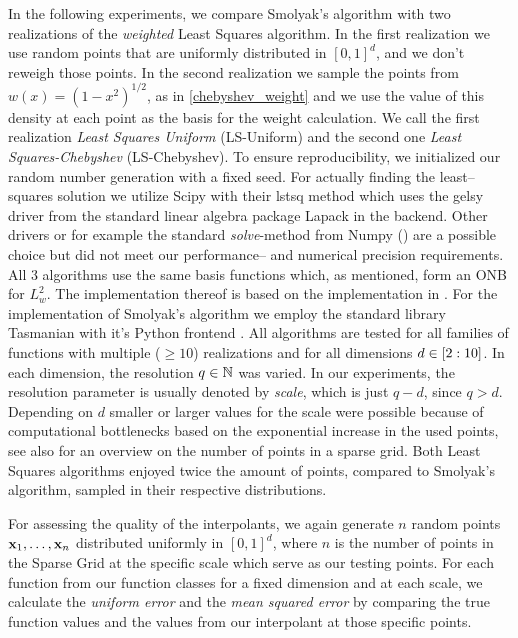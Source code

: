 \documentclass[12pt, oneside]{amsart}
\theoremstyle{definition}
\theoremstyle{remark}
\numberwithin{equation}{section}
\begin{document}
In the following experiments, we compare Smolyak's algorithm with two 
realizations of the \emph{weighted} Least Squares algorithm. In the first 
realization we use random points that are uniformly distributed in $[0,1]^d$, 
and we don't reweigh those points. In the second realization we sample the 
points from $w(x) = (1-x^2)^{1/2}$, as in \ref{chebyshev_weight} and we use the 
value of 
this density at each point as the basis for the weight calculation.
We call the first realization \emph{Least Squares Uniform} (LS-Uniform) and the 
second one \emph{Least Squares-Chebyshev} (LS-Chebyshev). 
To ensure reproducibility, we initialized our random number generation with a 
fixed seed.
For actually finding the least--squares solution we utilize Scipy 
\cite{Virtanen_Scipy} with their \textrm{lstsq} method which uses the 
\textrm{gelsy} driver from the standard linear algebra package Lapack 
\cite{lapack99} in the backend.
Other drivers or for example the standard \emph{solve}-method from Numpy 
(\cite{HarrisNumpy_2020}) are a possible choice but did not meet our 
performance-- and numerical precision requirements.
All 3 algorithms use the same basis functions  
which, as mentioned, form an ONB for \(L^2_w\). The implementation thereof is 
based on the implementation in \cite{JuddSmolyak_2014}. For the implementation 
of Smolyak's algorithm we employ the standard library Tasmanian with it's 
Python frontend 
\cite{stoyanov2015tasmanian,stoyanov2016dynamically,stoyanov2018adaptive,morrow2019method,doecode_6305}.
All algorithms are tested for all families of functions with multiple (\(\geq 
10\)) realizations and for all dimensions $d\in \indexset[2]{10}$. In 
each dimension, the resolution $q\in\N$ was varied. In our experiments, the 
resolution parameter is usually denoted by \emph{scale}, which is just $q-d$, 
since $q>d$. Depending on $d$ smaller or larger values for the scale were 
possible because of computational bottlenecks based on the exponential increase 
in the used points, see also \cite{BurkardtCounting_2014} for an overview on 
the number of points in a sparse grid. Both Least Squares algorithms enjoyed 
twice the amount of points, compared to Smolyak's algorithm, sampled in their 
respective distributions.

For assessing the quality of the interpolants, we again generate $n$ random 
points $\bfx_1, \ldots, \bfx_n$ distributed uniformly in $[0,1]^d$, where $n$ 
is the number of points in the Sparse Grid at the specific scale which serve as 
our testing points. For each function from our function classes for a fixed 
dimension and at each scale, we calculate 
the \emph{uniform error} and the \emph{mean squared error} by comparing the 
true function values and the values from our interpolant at those specific 
points.
\end{document}
